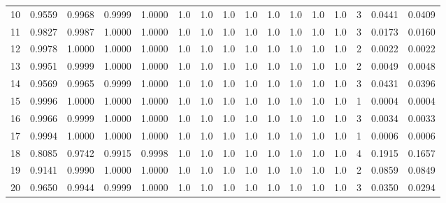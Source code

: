 \begin{tabular}{lrrrrrrrrrrrrrrr}
10  &      0.9559 &  0.9968 &  0.9999 &  1.0000 &     1.0 &     1.0 &     1.0 &     1.0 &     1.0 &     1.0 &      1.0 &        1.0 &      3 &                    0.0441 &                     0.0409 \\
11  &      0.9827 &  0.9987 &  1.0000 &  1.0000 &     1.0 &     1.0 &     1.0 &     1.0 &     1.0 &     1.0 &      1.0 &        1.0 &      3 &                    0.0173 &                     0.0160 \\
12  &      0.9978 &  1.0000 &  1.0000 &  1.0000 &     1.0 &     1.0 &     1.0 &     1.0 &     1.0 &     1.0 &      1.0 &        1.0 &      2 &                    0.0022 &                     0.0022 \\
13  &      0.9951 &  0.9999 &  1.0000 &  1.0000 &     1.0 &     1.0 &     1.0 &     1.0 &     1.0 &     1.0 &      1.0 &        1.0 &      2 &                    0.0049 &                     0.0048 \\
14  &      0.9569 &  0.9965 &  0.9999 &  1.0000 &     1.0 &     1.0 &     1.0 &     1.0 &     1.0 &     1.0 &      1.0 &        1.0 &      3 &                    0.0431 &                     0.0396 \\
15  &      0.9996 &  1.0000 &  1.0000 &  1.0000 &     1.0 &     1.0 &     1.0 &     1.0 &     1.0 &     1.0 &      1.0 &        1.0 &      1 &                    0.0004 &                     0.0004 \\
16  &      0.9966 &  0.9999 &  1.0000 &  1.0000 &     1.0 &     1.0 &     1.0 &     1.0 &     1.0 &     1.0 &      1.0 &        1.0 &      3 &                    0.0034 &                     0.0033 \\
17  &      0.9994 &  1.0000 &  1.0000 &  1.0000 &     1.0 &     1.0 &     1.0 &     1.0 &     1.0 &     1.0 &      1.0 &        1.0 &      1 &                    0.0006 &                     0.0006 \\
18  &      0.8085 &  0.9742 &  0.9915 &  0.9998 &     1.0 &     1.0 &     1.0 &     1.0 &     1.0 &     1.0 &      1.0 &        1.0 &      4 &                    0.1915 &                     0.1657 \\
19  &      0.9141 &  0.9990 &  1.0000 &  1.0000 &     1.0 &     1.0 &     1.0 &     1.0 &     1.0 &     1.0 &      1.0 &        1.0 &      2 &                    0.0859 &                     0.0849 \\
20  &      0.9650 &  0.9944 &  0.9999 &  1.0000 &     1.0 &     1.0 &     1.0 &     1.0 &     1.0 &     1.0 &      1.0 &        1.0 &      3 &                    0.0350 &                     0.0294 \\

\end{tabular}
